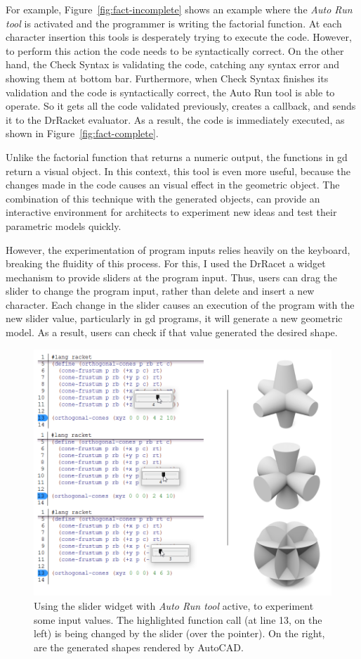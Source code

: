For example, Figure~\ref{fig:fact-incomplete} shows an example where the \textit{Auto Run tool} is activated and the programmer is writing the factorial function. At each character insertion this tools is desperately trying to execute the code. However, to perform this action the code needs to be syntactically correct. On the other hand, the Check Syntax is validating the code, catching any syntax error and showing them at bottom bar. Furthermore, when Check Syntax finishes its validation and the code is syntactically correct, the Auto Run tool is able to operate. So it gets all the code validated previously, creates a callback, and sends it to the DrRacket evaluator. As a result, the code is immediately executed, as shown in Figure~\ref{fig:fact-complete}.

Unlike the factorial function that returns a numeric output, the functions in \gls{gd} return a visual object. In this context, this tool is even more useful, because the changes made in the code causes an visual effect in the geometric object. The combination of this technique with the generated objects, can provide an interactive environment for architects to experiment new ideas and test their parametric models quickly.

However, the experimentation of program inputs relies heavily on the keyboard, breaking the fluidity of this process. For this, I used the DrRacet a widget mechanism to provide sliders at the program input. Thus, users can drag the slider to change the program input, rather than delete and insert a new character. Each change in the slider causes an execution of the program with the new slider value, particularly in \gls{gd} programs, it will generate a new geometric model. As a result, users can check if that value generated the desired shape. 

\begin{figure}[!h]
  \centering
  \includegraphics[width=.6\textwidth]{images/orto-cones-run}
    \caption{Using the slider widget with \textit{Auto Run tool} active, to experiment some input values. The highlighted function call (at line 13, on the left) is being changed by the slider (over the pointer). On the right, are the generated shapes rendered by AutoCAD.}
  \label{fig:orto-cone-run}
\end{figure}

